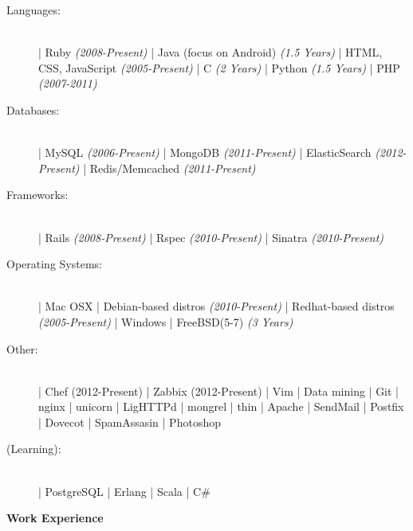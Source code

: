 \documentclass[letterpaper,11pt]{article}
\newcommand{\resheading}[1]{{\large \colorbox{myblue}{\begin{minipage}{\textwidth}{\textbf{#1 \vphantom{p\^{E}}}}\end{minipage}}}}
\begin{document}
\begin{description}
    \item[Languages:] \hfill \\
        | Ruby \textit{(2008-Present)} 
        | Java (focus on Android) \textit{(1.5 Years)} 
        | HTML, CSS, JavaScript \textit{(2005-Present)} 
        | C \textit{(2 Years)} 
        | Python \textit{(1.5 Years)} 
        | PHP \textit{(2007-2011)}
    \item[Databases:] \hfill  \\
        | MySQL \textit{(2006-Present)} 
        | MongoDB \textit{(2011-Present)}
        | ElasticSearch \textit{(2012-Present)}
        | Redis/Memcached \textit{(2011-Present)}
    \item[Frameworks:] \hfill \\
        | Rails \textit{(2008-Present)} 
        | Rspec \textit{(2010-Present)}    
        | Sinatra \textit{(2010-Present)} 
    \item[Operating Systems:] \hfill \\
        | Mac OSX   
        | Debian-based distros \textit{(2010-Present)}
        | Redhat-based distros \textit{(2005-Present)}
        | Windows   
        | FreeBSD(5-7) \textit{(3 Years)}
    \item[Other:] \hfill \\
        | Chef (2012-Present)
        | Zabbix (2012-Present)
        | Vim       
        | Data mining 
        | Git       
        | nginx     
        | unicorn   
        | LigHTTPd  
        | mongrel   
        | thin      
        | Apache   
        | SendMail
        | Postfix  
        | Dovecot 
        | SpamAssasin 
        | Photoshop 
    \item[(Learning):] \hfill \\
        | PostgreSQL
        | Erlang 
        | Scala 
        | C\#
\end{description}

\resheading{Work Experience}
\end{document}
